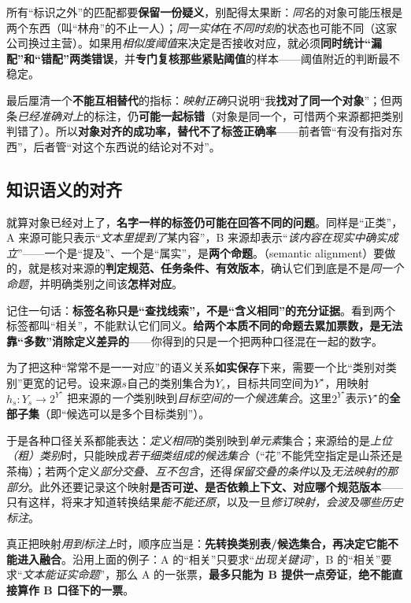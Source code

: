 所有“标识之外”的匹配都要\textbf{保留一份疑义}，别配得太果断：\emph{同名}的对象可能压根是两个东西（叫“林舟”的不止一人）；\emph{同一实体}在\emph{不同时刻}的状态也可能不同（这家公司换过主营）。如果用\emph{相似度阈值}来决定是否接收对应，就必须\textbf{同时统计“漏配”和“错配”两类错误}，并\textbf{专门复核那些紧贴阈值}的样本——阈值附近的判断最不稳定。

最后厘清一个\textbf{不能互相替代}的指标：\emph{映射正确}只说明“我\textbf{找对了同一个对象}”；但两条\emph{已经准确对上}的标注，仍\textbf{可能一起标错}（对象是同一个，可惜两个来源都把类别判错了）。所以\textbf{对象对齐的成功率，替代不了标签正确率}——前者管“有没有指对东西”，后者管“对这个东西说的结论对不对”。

\subsection{知识语义的对齐}
\label{sec:knowledge-fusion-semantic-alignment}

就算对象已经对上了，\textbf{名字一样的标签仍可能在回答不同的问题}。同样是“正类”，A 来源可能只表示“\emph{文本里提到了}某内容”，B 来源却表示“\emph{该内容在现实中确实成立}”——一个是“提及”、一个是“属实”，是\textbf{两个命题}。（semantic alignment）要做的，就是核对来源的\textbf{判定规范、任务条件、有效版本}，确认它们到底是不是\emph{同一个命题}，并明确类别之间该\textbf{怎样对应}。

记住一句话：\textbf{标签名称只是“查找线索”，不是“含义相同”的充分证据}。看到两个标签都叫“相关”，不能默认它们同义。\textbf{给两个本质不同的命题去累加票数，是无法靠“多数”消除定义差异的}——你得到的只是一个把两种口径混在一起的数字。

为了把这种“常常不是一一对应”的语义关系\textbf{如实保存}下来，需要一个比“类别对类别”更宽的记号。设来源$s$自己的类别集合为$Y_s$，目标共同空间为$Y^\star$，用映射
$h_s:Y_s\to 2^{Y^\star}$
把来源的\emph{一个}类别映到\emph{目标空间的一个候选集合}。这里$2^{Y^\star}$表示$Y^\star$的\textbf{全部子集}（即“候选可以是多个目标类别”）。

于是各种口径关系都能表达：\emph{定义相同}的类别映到\emph{单元素}集合；来源给的是\emph{上位（粗）类别}时，只能映成\emph{若干细类组成的候选集合}（“花”不能凭空指定是山茶还是茶梅）；若两个定义\emph{部分交叠、互不包含}，还得\emph{保留交叠的条件}以及\emph{无法映射的那部分}。此外还要记录这个映射\textbf{是否可逆、是否依赖上下文、对应哪个规范版本}——只有这样，将来才知道转换结果\emph{能不能还原}，以及一旦\emph{修订映射，会波及哪些历史标注}。

真正把映射\emph{用到标注上}时，顺序应当是：\textbf{先转换类别表/候选集合，再决定它能不能进入融合}。沿用上面的例子：A 的“相关”只要求“\emph{出现关键词}”，B 的“相关”要求“\emph{文本能证实命题}”，那么 A 的一张票，\textbf{最多只能为 B 提供一点旁证}，\textbf{绝不能直接算作 B 口径下的一票}。

